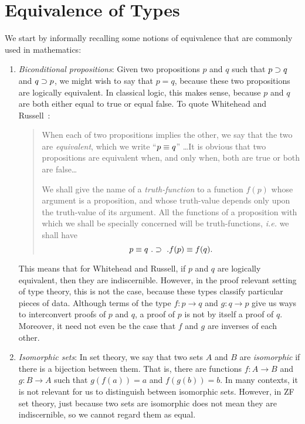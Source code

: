 \documentclass[12pt]{article}
\begin{document}
\section{Equivalence of Types}

We start by informally recalling some notions of equivalence that are commonly
used in mathematics:

\begin{enumerate}

\item \emph{Biconditional propositions}: Given two propositions $p$ and $q$
such that $p \supset q$ and $q \supset p$, we might wish to say that $p = q$,
because these two propositions are logically equivalent. In classical logic,
this makes sense, because $p$ and $q$ are both either equal to true or equal
false. To quote Whitehead and Russell~\cite[p.115]{Whitehead63}:

\begin{quotation}

When each of two propositions implies the other, we say that the two are
\emph{equivalent}, which we write ``$p \equiv q$'' \dots It is obvious that two
propositions are equivalent when, and only when, both are true or both are
false\dots

We shall give the name of a \emph{truth-function} to a function
$f(p)$ whose argument is a proposition, and whose truth-value
depends only upon the truth-value of its argument. All the functions
of a proposition with which we shall be specially concerned will be
truth-functions, \emph{i.e.} we shall have
%
\begin{equation*}
p \equiv q \ . \supset \ . f(p) \equiv f(q) . 
\end{equation*}
%
\end{quotation}

This means that for Whitehead and Russell, if $p$ and $q$ are logically
equivalent, then they are indiscernible. However, in the proof relevant setting
of type theory, this is not the case, because these types classify particular
pieces of data.  Although terms of the type $f : p \to q$ and $g : q \to p$
give us ways to interconvert proofs of $p$ and $q$, a proof of $p$ is not by
itself a proof of $q$.  Moreover, it need not even be the case that $f$ and $g$
are inverses of each other.

\item \emph{Isomorphic sets}: In set theory, we say that two sets $A$ and $B$
are \emph{isomorphic} if there is a bijection between them. That is, there are
functions $f : A \to B$ and $g : B \to A$ such that $g(f(a)) = a$ and $f(g(b))
= b$. In many contexts, it is not relevant for us to distinguish between
isomorphic sets. However, in ZF set theory, just because two sets are
isomorphic does not mean they are indiscernible, so we cannot regard them
as equal.


\end{enumerate}
\end{document}
